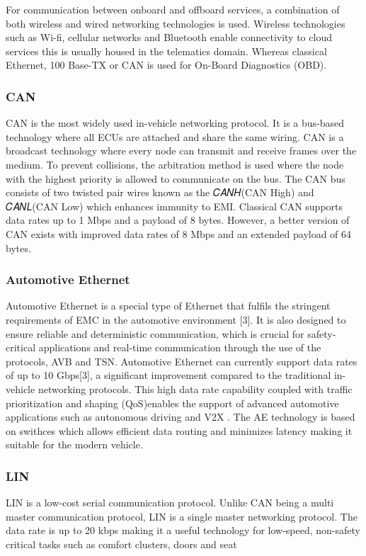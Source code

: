 \documentclass{report}
\begin{document}
For communication between onboard and offboard services, a combination of both wireless and wired networking technologies is used. Wireless technologies such as Wi-fi, cellular networks and Bluetooth enable connectivity to cloud services  this is usually housed in the telematics domain. Whereas classical Ethernet, 100 Base-TX or CAN is used for On-Board Diagnostics (OBD).

\subsubsection{CAN}
CAN is the most widely used in-vehicle networking protocol. It is a bus-based technology where all ECUs are attached and share the same wiring. CAN is a broadcast technology where every node can transmit and receive frames over the medium. To prevent collisions, the arbitration method is used where the node with the highest priority is allowed to communicate on the bus. The CAN bus consists of two twisted pair wires known as the 𝐶𝐴𝑁𝐻(CAN High) and 𝐶𝐴𝑁𝐿(CAN Low)  which enhances immunity to EMI. Classical CAN supports data rates up to 1 Mbps and a payload of 8 bytes. However, a better version of CAN exists with improved data rates of 8 Mbps and an extended payload of 64 bytes.

\subsubsection{Automotive Ethernet}
Automotive Ethernet is a special type of Ethernet that fulfils the stringent requirements of EMC in the automotive environment [3]. It is also designed to ensure reliable and deterministic communication, which is crucial for safety-critical applications and real-time communication through the use of the protocols, AVB and TSN.
Automotive Ethernet can currently support data rates of up to 10 Gbps[3], a significant improvement compared to the traditional in-vehicle networking protocols. This high data rate capability coupled with traffic prioritization and shaping (QoS)enables the support of advanced automotive applications such as autonomous driving and V2X . The AE technology is based on swithces which allows efficient data routing and minimizes latency making it suitable for the modern vehicle.

\subsubsection{LIN}
LIN is a low-cost serial communication protocol. Unlike CAN being a multi master communication protocol, LIN is a single master networking protocol. The data rate is up to 20 kbps making it a useful technology for low-speed, non-safety critical tasks such as comfort clusters, doors and seat
\end{document}
